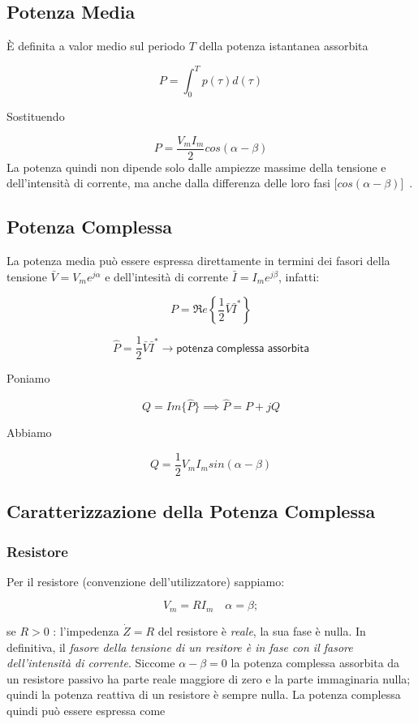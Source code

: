 \documentclass[a4paper]{report}
\begin{document}
\subsection{Potenza Media}
\`E definita a valor medio sul periodo $T$ della potenza istantanea
assorbita

\[
P=\int_0^T p(\tau) d(\tau)
\]

Sostituendo

\[
P=\dfrac{V_mI_m}{2}cos(\alpha -\beta)
\]
La potenza quindi non dipende solo dalle ampiezze massime della
tensione e dell'intensit\`a di corrente, ma anche dalla differenza
delle loro fasi [$cos(\alpha -\beta)$]\ .


\subsection{Potenza Complessa}
La potenza media pu\`o essere espressa direttamente in termini dei
fasori della tensione $\bar V=V_me^{j\alpha}$ e dell'intesit\`a di
corrente $\bar I=I_me^{j\beta}$, infatti:

\[
P=\Re e\left\{\dfrac{1}{2}\bar{V}\bar{I}^*\right\}
\]

\[
\widehat P=\dfrac{1}{2} \bar{V}\bar{I}^* \longrightarrow \mathsf{potenza\;
  complessa\; assorbita}
\]

Poniamo

\[
Q=Im \{\widehat P \} \implies \widehat P=P+jQ
\]

Abbiamo

\[
Q=\dfrac{1}{2}V_mI_m sin (\alpha-\beta)
\]

\subsection{Caratterizzazione della Potenza Complessa}

\subsubsection{Resistore}
Per il resistore (convenzione dell'utilizzatore) sappiamo:

\[
V_m=RI_m \quad \alpha = \beta; 
\]

se $R>0$ : l'impedenza $\dot Z = R$ del resistore \`e \emph{reale}, la sua 
fase \`e nulla. In definitiva, il \emph{fasore della tensione di un resitore
\`e in fase con il fasore dell'intensit\`a di corrente}\@.
Siccome $\alpha-\beta = 0$ la potenza complessa assorbita da un resistore passivo
ha parte reale maggiore di zero e la parte immaginaria nulla; quindi la potenza
reattiva di un resistore \`e sempre nulla. La potenza complessa quindi pu\`o essere
espressa come 
\end{document}
